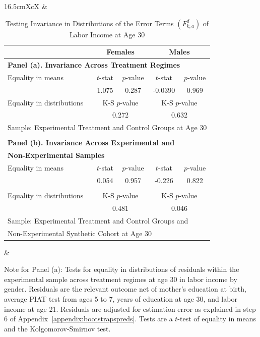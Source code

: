 \begin{table}[!htpb]
\begin{threeparttable}
\caption{Testing Invariance in Distributions of the  Error Terms $\left( F_{k,a}^d \right)$ of Labor Income at Age 30} \label{table:invarianceerrors}
\centering
\footnotesize
\begin{tabularx}{16.5cm}{XcX}
& \begin{tabular}{lcccc} \toprule
& \multicolumn{2}{c}{Females} &   \multicolumn{2}{c}{Males} \\ \midrule
\multicolumn{5}{l}{\textbf{Panel (a). Invariance Across Treatment Regimes}} \\
 Equality in means & $t$-stat & $p$-value & $t$-stat & $p$-value \\
 & 1.075 & 0.287 & -0.0390 &  0.969  \\
Equality in distributions & \multicolumn{2}{c}{K-S $p$-value} &  \multicolumn{2}{c}{K-S $p$-value}  \\
                                      & \multicolumn{2}{c}{0.272} &  \multicolumn{2}{c}{0.632}  \\
\multicolumn{5}{l}{Sample: Experimental Treatment and Control Groups at Age 30} \\ \\
\multicolumn{5}{l}{\textbf{Panel (b). Invariance Across Experimental and }} \\
\multicolumn{5}{l}{\textbf{Non-Experimental Samples}} \\
Equality in means & $t$-stat & $p$-value & $t$-stat & $p$-value \\
 & 0.054  & 0.957 & -0.226 & 0.822   \\ \\
Equality in distributions & \multicolumn{2}{c}{K-S $p$-value} &  \multicolumn{2}{c}{K-S $p$-value}  \\
                                      & \multicolumn{2}{c}{0.481} &  \multicolumn{2}{c}{0.046}  \\
\multicolumn{5}{l}{Sample: Experimental Treatment and Control Groups and} \\
\multicolumn{5}{l}{Non-Experimental Synthetic Cohort at Age 30 } \\ \bottomrule
\end{tabular} &
\end{tabularx}
\begin{tablenotes}
\footnotesize
\item Note for Panel (a): Tests for equality in distributions of residuals within the experimental sample across treatment regimes at age 30 in labor income by gender. Residuals are the relevant outcome net of mother's education at birth, average PIAT test from ages 5 to 7, years of education at age 30, and labor income at age 21. Residuals are adjusted for estimation error as explained in step 6 of Appendix~\ref{appendix:bootstrapspreds}. Tests are a $t$-test of equality in means and the Kolgomorov-Smirnov test.\\

\end{tablenotes}
\end{threeparttable}
\end{table}
